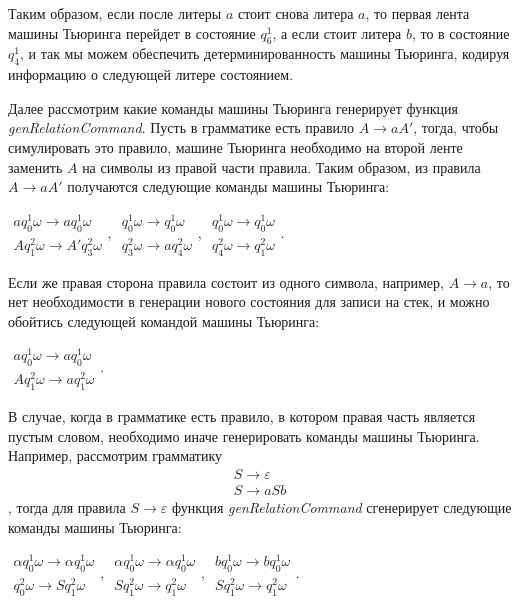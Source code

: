 \documentclass[14pt]{matmex-diploma-custom}
\begin{document}
Таким образом, если после литеры $a$ стоит снова литера $a$, то первая лента машины Тьюринга перейдет в состояние $q_6^1$, а если стоит литера $b$, то в состояние $q_4^1$, и так мы можем обеспечить детерминированность машины Тьюринга, кодируя информацию о следующей литере состоянием. 

Далее рассмотрим какие команды машины Тьюринга генерирует функция \textit{genRelationCommand}.
Пусть в грамматике есть правило $A \to a A'$, тогда, чтобы симулировать это правило, машине Тьюринга
необходимо на второй ленте заменить $A$ на символы из правой части правила. Таким образом, из правила $A \to a A'$ получаются 
следующие команды машины Тьюринга: 

$\begin{array}{lcl}
    a q_0^1 \omega \to a q_0^1 \omega \\
    A q_1^2 \omega \to A' q_3^2 \omega 
\end{array}$,
$\begin{array}{lcl}
    q_0^1 \omega \to q_0^1 \omega \\
    q_3^2 \omega \to a q_4^2 \omega 
\end{array}$,
$\begin{array}{lcl}
    q_0^1 \omega \to q_0^1 \omega \\
    q_4^2 \omega \to q_1^2 \omega 
\end{array}$. 

Если же правая сторона правила состоит из одного символа, например, $A \to a$, то нет необходимости в генерации нового состояния для записи на стек, и можно обойтись следующей командой машины Тьюринга: 

$\begin{array}{lcl}
    a q_0^1 \omega \to a q_0^1 \omega \\
    A q_1^2 \omega \to a q_1^2 \omega 
\end{array}$. 

В случае, когда в грамматике есть правило, в котором правая часть является пустым словом, необходимо иначе генерировать команды машины Тьюринга. Например, рассмотрим грамматику 
$$\begin{array}{lcl}
    S \to \varepsilon \\
    S \to a S b
\end{array}$$
, тогда для правила $S \to \varepsilon$ функция \textit{genRelationCommand} сгенерирует следующие команды машины Тьюринга:

$\begin{array}{lcl}
    \alpha q_0^1 \omega \to \alpha q_0^1 \omega \\
    q_0^2 \omega \to S q_1^2 \omega 
\end{array}$,
$\begin{array}{lcl}
    \alpha q_0^1 \omega \to \alpha q_0^1 \omega \\
    S q_1^2 \omega \to q_1^2 \omega 
\end{array}$,
$\begin{array}{lcl}
    b q_0^1 \omega \to b q_0^1 \omega \\
    S q_1^2 \omega \to q_1^2 \omega 
\end{array}$.
\end{document}
